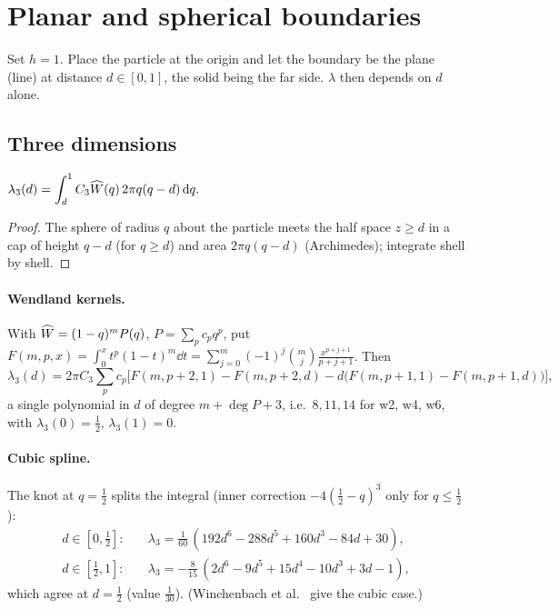 \section{Planar and spherical boundaries}\label{sec:planar}

Set $h=1$. Place the particle at the origin and let the boundary be the plane (line) at distance
$d\in[0,1]$, the solid being the far side. $\lambda$ then depends on $d$ alone.

\subsection{Three dimensions}
\begin{proposition}\label{prop:planar3}
$\displaystyle \lambda_3(d)=\int_d^1 C_3\widehat W(q)\,2\pi q(q-d)\,\mathrm{d} q.$ 
\end{proposition}
\begin{proof}
The sphere of radius $q$ about the particle meets the half space $z\ge d$ in a cap of height $q-d$
(for $q\ge d$) and area $2\pi q(q-d)$ (Archimedes); integrate shell by shell.
\end{proof}

\paragraph{Wendland kernels.} With $\widehat W=(1-q)^m P(q)$, $P=\sum_p c_pq^p$, put
$F(m,p,x)=\int_0^x t^p(1-t)^m\dd t=\sum_{j=0}^m(-1)^j\binom mj\frac{x^{p+j+1}}{p+j+1}$. Then
\begin{equation}\label{eq:lam3-wend}
 \lambda_3(d)=2\pi C_3\sum_p c_p\Big[F(m,p{+}2,1)-F(m,p{+}2,d)-d\big(F(m,p{+}1,1)-F(m,p{+}1,d)\big)\Big],
\end{equation}
a single polynomial in $d$ of degree $m+\deg P+3$, i.e.\ $8,11,14$ for w2, w4, w6, with $\lambda_3(0)=\frac12$,
$\lambda_3(1)=0$. 

\paragraph{Cubic spline.} The knot at $q=\frac12$ splits the integral (inner correction $-4(\frac12-q)^3$
only for $q\le\frac12$):
\begin{align}
 d\in[0,\tfrac12]:&\quad \lambda_3=\tfrac1{60}\,(192d^6-288d^5+160d^3-84d+30),\\
 d\in[\tfrac12,1]:&\quad \lambda_3=-\tfrac{8}{15}\,(2d^6-9d^5+15d^4-10d^3+3d-1),
\end{align}
which agree at $d=\frac12$ (value $\frac1{30}$).  (Winchenbach et al.~\cite{winchenbach2020} give the cubic case.)


